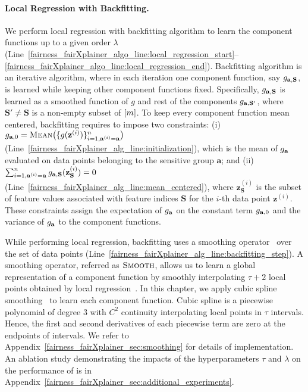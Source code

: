 \paragraph{Local Regression with Backfitting.} We perform local regression with backfitting algorithm to learn the component functions up to a given order $ \lambda $ (Line~\ref{fairness_fairXplainer_algo_line:local_regression_start}--\ref{fairness_fairXplainer_algo_line:local_regression_end}). Backfitting algorithm is an iterative algorithm, where in each iteration one component function, say $ g_{\mathbf{a}, \mathbf{S}} $, is learned while keeping other component functions fixed. Specifically, $ g_{\mathbf{a}, \mathbf{S}} $ is learned as a smoothed function of $ g $ and rest of the components $ g_{\mathbf{a}, \mathbf{S}'} $, where $ \mathbf{S}' \ne \mathbf{S} $ is a non-empty subset of $ [m] $. To keep every component function mean centered, backfitting requires to impose two constraints: (i) $ g_{\mathbf{a}, 0} = \textsc{Mean}\big(\{g(\mathbf{z}^{(i)})\}_{i=1, \mathbf{a}^{(i)} = \mathbf{a}}^n\big) $ (Line~\ref{fairness_fairXplainer_alg_line:initialization}), which is the mean of $ g_{\mathbf{a}} $ evaluated on data points belonging to the sensitive group $ \mathbf{a} $;  and (ii) $ \sum_{i=1, \mathbf{a}^{(i)} = \mathbf{a}}^ng_{\mathbf{a}, \mathbf{S}}(\mathbf{z}_{\mathbf{S}}^{(i)}) = 0$ (Line~\ref{fairness_fairXplainer_alg_line:mean_centered}), where $ \mathbf{z}_{\mathbf{S}}^{(i)} $ is the subset of feature values associated with feature indices $ \mathbf{S} $ for the $ i $-th data point $  \mathbf{z}^{(i)} $. These constraints assign the expectation of $ g_{\mathbf{a}} $ on the constant term $ g_{\mathbf{a}, 0} $ and the variance of $ g_{\mathbf{a}} $ to the component functions.                                       


While performing local regression, backfitting uses a smoothing operator~\cite{loader2012smoothing} over the set of data points (Line~\ref{fairness_fairXplainer_alg_line:backfitting_step}). A smoothing operator, referred as $ \textsc{Smooth} $, allows us to learn a global representation of a component function by smoothly interpolating $\tau + 2$ local points obtained by local regression~\cite{loader2012smoothing}. In this chapter, we apply cubic spline smoothing~\cite{li2010global} to learn each component function. Cubic spline is a piecewise polynomial of degree $ 3 $ with $ C^2 $ continuity interpolating local points in $ \tau $ intervals. Hence, the first and second derivatives of each piecewise term are zero at the endpoints of intervals. We refer to Appendix~\ref{fairness_fairXplainer_sec:smoothing} for details of implementation. An ablation study demonstrating the impacts of the hyperparameters $\tau$ and $\lambda$ on the performance of {\fairXplainer} is in Appendix~\ref{fairness_fairXplainer_sec:additional_experiments}. %







